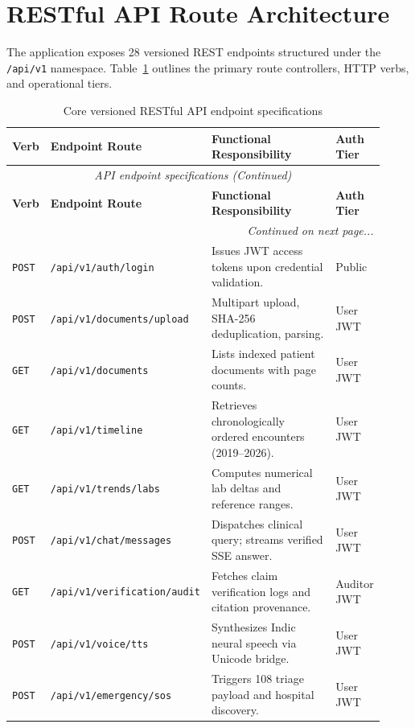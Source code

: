 \section{RESTful API Route Architecture}
\label{sec:arch_api_routes}

The application exposes 28 versioned REST endpoints structured under the \texttt{/api/v1} namespace. Table~\ref{tab:4_2_endpoints} outlines the primary route controllers, HTTP verbs, and operational tiers.

\small
\begin{longtable}{@{}p{0.10\linewidth} p{0.36\linewidth} p{0.34\linewidth} p{0.12\linewidth}@{}}
\caption{Core versioned RESTful API endpoint specifications}\label{tab:4_2_endpoints} \\
\toprule
\textbf{Verb} & \textbf{Endpoint Route} & \textbf{Functional Responsibility} & \textbf{Auth Tier} \\
\midrule
\endfirsthead
\toprule
\multicolumn{4}{c}{\small\textit{API endpoint specifications (Continued)}} \\[4pt]
\midrule
\textbf{Verb} & \textbf{Endpoint Route} & \textbf{Functional Responsibility} & \textbf{Auth Tier} \\
\midrule
\endhead
\midrule
\multicolumn{4}{r}{\footnotesize\textit{Continued on next page...}} \\
\bottomrule
\endfoot
\bottomrule
\endlastfoot
\texttt{POST} & \texttt{/api/\allowbreak v1/\allowbreak auth/\allowbreak login} & Issues JWT access tokens upon credential validation. & Public \\
\midrule
\texttt{POST} & \texttt{/api/\allowbreak v1/\allowbreak documents/\allowbreak upload} & Multipart upload, SHA-256 deduplication, parsing. & User JWT \\
\midrule
\texttt{GET} & \texttt{/api/\allowbreak v1/\allowbreak documents} & Lists indexed patient documents with page counts. & User JWT \\
\midrule
\texttt{GET} & \texttt{/api/\allowbreak v1/\allowbreak timeline} & Retrieves chronologically ordered encounters (2019--2026). & User JWT \\
\midrule
\texttt{GET} & \texttt{/api/\allowbreak v1/\allowbreak trends/\allowbreak labs} & Computes numerical lab deltas and reference ranges. & User JWT \\
\midrule
\texttt{POST} & \texttt{/api/\allowbreak v1/\allowbreak chat/\allowbreak messages} & Dispatches clinical query; streams verified SSE answer. & User JWT \\
\midrule
\texttt{GET} & \texttt{/api/\allowbreak v1/\allowbreak verification/\allowbreak audit} & Fetches claim verification logs and citation provenance. & Auditor JWT \\
\midrule
\texttt{POST} & \texttt{/api/\allowbreak v1/\allowbreak voice/\allowbreak tts} & Synthesizes Indic neural speech via Unicode bridge. & User JWT \\
\midrule
\texttt{POST} & \texttt{/api/\allowbreak v1/\allowbreak emergency/\allowbreak sos} & Triggers 108 triage payload and hospital discovery. & User JWT \\
\bottomrule
\end{longtable}
\normalsize



